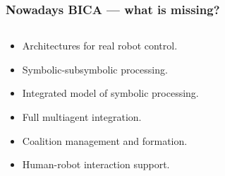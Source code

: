 \documentclass[default]{beamer}
\begin{document}
	\begin{frame}
		\frametitle{Nowadays BICA --- what is missing?}
		\begin{columns}
			\begin{column}{0.6\textwidth}
				\begin{itemize}
					\item Architectures for real robot control.
					\item Symbolic-subsymbolic processing.
					\item Integrated model of symbolic processing.
					\item Full multiagent integration.			
					\item Coalition management and formation.
					\item Human-robot interaction support.
				\end{itemize}
				\nocite{*}
				\printbibliography[keyword={please}, resetnumbers=true]
				

\end{column}
\end{columns}
\end{frame}
\end{document}
